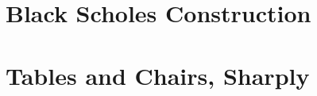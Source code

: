 \documentclass[12pt,letterpaper,oneside]{book}
\theoremstyle{plain}
\theoremstyle{definition}
\theoremstyle{remark}
\numberwithin{theorem}{chapter}
\begin{document}
\chapter{Black Scholes Construction}



\appendix
\chapter{Tables and Chairs, Sharply}




\end{document}
